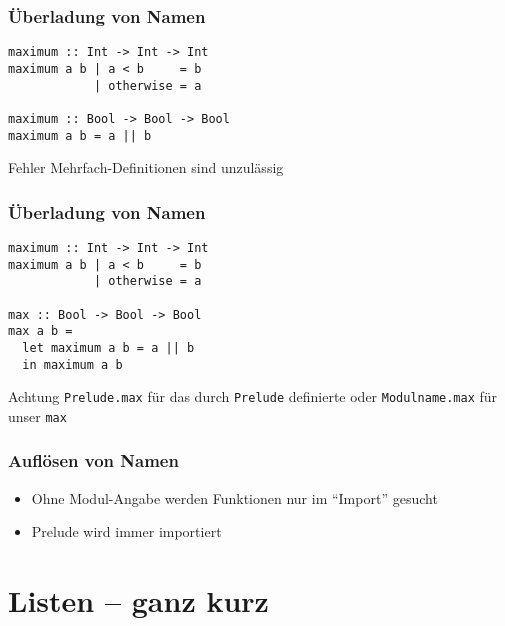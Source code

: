 \documentclass[fleqn,11pt,aspectratio=43]{beamer}
\begin{document}
\begin{frame}[fragile]
\frametitle{Überladung von Namen} 
\begin{lstlisting}
maximum :: Int -> Int -> Int
maximum a b | a < b 	= b
            | otherwise = a

maximum :: Bool -> Bool -> Bool
maximum a b = a || b
\end{lstlisting}
\begin{alertblock}{Fehler}
Mehrfach-Definitionen sind unzulässig
\end{alertblock}
\end{frame}

\begin{frame}[fragile]
\frametitle{Überladung von Namen} 
\begin{lstlisting}
maximum :: Int -> Int -> Int
maximum a b | a < b 	= b
            | otherwise = a

max :: Bool -> Bool -> Bool
max a b = 
  let maximum a b = a || b
  in maximum a b
\end{lstlisting}
\begin{alertblock}{Achtung}
\lstinline|Prelude.max| für das durch \lstinline|Prelude| definierte oder \lstinline|Modulname.max| für unser \lstinline|max|
\end{alertblock}
\end{frame}


\begin{frame}
\frametitle{Auflösen von Namen}
\begin{block}{\vspace*{-3ex}}
\begin{itemize}
  \item Ohne Modul-Angabe werden Funktionen nur im "`Import"' gesucht
  \item Prelude wird immer importiert 
\end{itemize}
\end{block}
\end{frame}

\section{Listen -- ganz kurz~}
\end{document}

